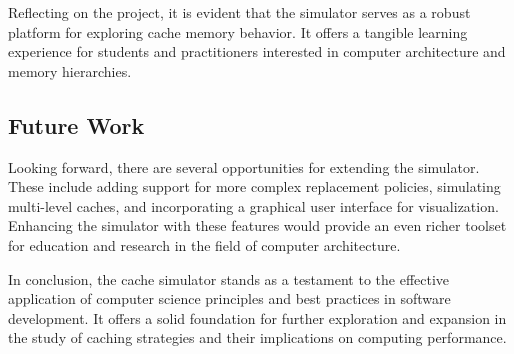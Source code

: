 \documentclass[12pt]{article}
\begin{document}
Reflecting on the project, it is evident that the simulator serves as a robust platform for exploring cache memory behavior. It offers a tangible learning experience for students and practitioners interested in computer architecture and memory hierarchies.

\subsection{Future Work}

Looking forward, there are several opportunities for extending the simulator. These include adding support for more complex replacement policies, simulating multi-level caches, and incorporating a graphical user interface for visualization. Enhancing the simulator with these features would provide an even richer toolset for education and research in the field of computer architecture.

In conclusion, the cache simulator stands as a testament to the effective application of computer science principles and best practices in software development. It offers a solid foundation for further exploration and expansion in the study of caching strategies and their implications on computing performance.
\end{document}
